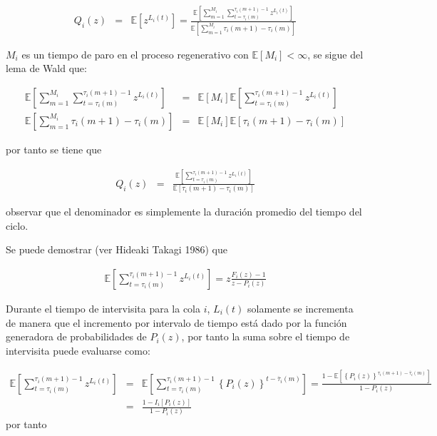 \documentclass{article}
\newcommand{\esp}{\mathbb{E}}
\begin{document}
\begin{eqnarray*}
Q_{i}\left(z\right)&=&\esp\left[z^{L_{i}\left(t\right)}\right]=\frac{\esp\left[\sum_{m=1}^{M_{i}}\sum_{t=\tau_{i}\left(m\right)}^{\tau_{i}\left(m+1\right)-1}z^{L_{i}\left(t\right)}\right]}{\esp\left[\sum_{m=1}^{M_{i}}\tau_{i}\left(m+1\right)-\tau_{i}\left(m\right)\right]}
\end{eqnarray*}

$M_{i}$ es un tiempo de paro en el proceso regenerativo con $\esp\left[M_{i}\right]<\infty$, se sigue del lema de Wald que:


\begin{eqnarray*}
\esp\left[\sum_{m=1}^{M_{i}}\sum_{t=\tau_{i}\left(m\right)}^{\tau_{i}\left(m+1\right)-1}z^{L_{i}\left(t\right)}\right]&=&\esp\left[M_{i}\right]\esp\left[\sum_{t=\tau_{i}\left(m\right)}^{\tau_{i}\left(m+1\right)-1}z^{L_{i}\left(t\right)}\right]\\
\esp\left[\sum_{m=1}^{M_{i}}\tau_{i}\left(m+1\right)-\tau_{i}\left(m\right)\right]&=&\esp\left[M_{i}\right]\esp\left[\tau_{i}\left(m+1\right)-\tau_{i}\left(m\right)\right]
\end{eqnarray*}

por tanto se tiene que


\begin{eqnarray*}
Q_{i}\left(z\right)&=&\frac{\esp\left[\sum_{t=\tau_{i}\left(m\right)}^{\tau_{i}\left(m+1\right)-1}z^{L_{i}\left(t\right)}\right]}{\esp\left[\tau_{i}\left(m+1\right)-\tau_{i}\left(m\right)\right]}
\end{eqnarray*}

observar que el denominador es simplemente la duraci\'on promedio del tiempo del ciclo.


Se puede demostrar (ver Hideaki Takagi 1986) que

\begin{eqnarray*}
\esp\left[\sum_{t=\tau_{i}\left(m\right)}^{\tau_{i}\left(m+1\right)-1}z^{L_{i}\left(t\right)}\right]=z\frac{F_{i}\left(z\right)-1}{z-P_{i}\left(z\right)}
\end{eqnarray*}

Durante el tiempo de intervisita para la cola $i$, $L_{i}\left(t\right)$ solamente se incrementa de manera que el incremento por intervalo de tiempo est\'a dado por la funci\'on generadora de probabilidades de $P_{i}\left(z\right)$, por tanto la suma sobre el tiempo de intervisita puede evaluarse como:

\begin{eqnarray*}
\esp\left[\sum_{t=\tau_{i}\left(m\right)}^{\tau_{i}\left(m+1\right)-1}z^{L_{i}\left(t\right)}\right]&=&\esp\left[\sum_{t=\tau_{i}\left(m\right)}^{\tau_{i}\left(m+1\right)-1}\left\{P_{i}\left(z\right)\right\}^{t-\overline{\tau}_{i}\left(m\right)}\right]=\frac{1-\esp\left[\left\{P_{i}\left(z\right)\right\}^{\tau_{i}\left(m+1\right)-\overline{\tau}_{i}\left(m\right)}\right]}{1-P_{i}\left(z\right)}\\
&=&\frac{1-I_{i}\left[P_{i}\left(z\right)\right]}{1-P_{i}\left(z\right)}
\end{eqnarray*}
por tanto
\end{document}
